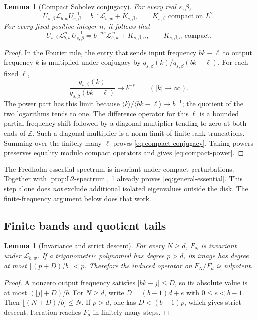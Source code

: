 \documentclass[11pt,a4paper]{article}
\newtheorem{lemma}[theorem]{Lemma}
\theoremstyle{definition}
\theoremstyle{remark}
\newcommand{\Z}{\mathbb Z}
\newcommand{\Lop}{\mathcal L}
\newcommand{\br}[1]{\langle#1\rangle}
\numberwithin{equation}{section}
\begin{document}
\begin{lemma}[Compact Sobolev conjugacy]
\label{lem:compact-conjugacy}
For every real $s,\beta$,
\begin{equation}
 U_{s,\beta}\Lop_{b,w}U_{s,\beta}^{-1}
 =b^{-s}\Lop_{b,w}+K_{s,\beta},
 \qquad K_{s,\beta}\text{ compact on }L^2.
 \label{eq:compact-conjugacy}
\end{equation}
For every fixed positive integer $n$, it follows that
\begin{equation}
 U_{s,\beta}\Lop_{b,w}^{\,n}U_{s,\beta}^{-1}
 =b^{-ns}\Lop_{b,w}^{\,n}+K_{s,\beta,n},
 \qquad K_{s,\beta,n}\text{ compact}.
 \label{eq:compact-power}
\end{equation}
\end{lemma}
\begin{proof}
In the Fourier rule, the entry that sends input frequency $bk-\ell$ to
output frequency $k$ is multiplied under conjugacy by
$q_{s,\beta}(k)/q_{s,\beta}(bk-\ell)$. For each fixed $\ell$,
\begin{equation}
 \frac{q_{s,\beta}(k)}{q_{s,\beta}(bk-\ell)}\longrightarrow b^{-s}
 \qquad (|k|\to\infty).
 \label{eq:weight-ratio}
\end{equation}
The power part has this limit because
$\br{k}/\br{bk-\ell}\to b^{-1}$; the quotient of the two logarithms tends
to one. The difference operator for this $\ell$ is a bounded partial
frequency shift followed by a diagonal multiplier tending to zero at both
ends of $\Z$. Such a diagonal multiplier is a norm limit of finite-rank
truncations. Summing over the finitely many $\ell$ proves
\eqref{eq:compact-conjugacy}. Taking powers preserves equality modulo
compact operators and gives \eqref{eq:compact-power}.
\end{proof}

The Fredholm essential spectrum is invariant under compact perturbations.
Together with \cref{prop:L2-spectrum}, \cref{lem:compact-conjugacy}
already proves \eqref{eq:general-essential}. This step alone does
\emph{not} exclude additional isolated eigenvalues outside the disk.
The finite-frequency argument below does that work.

\subsection{Finite bands and quotient tails}
\begin{lemma}[Invariance and strict descent]
\label{lem:band}
For every $N\ge d$, $F_N$ is invariant under $\Lop_{b,w}$. If a
trigonometric polynomial has degree $p>d$, its image has degree at most
$\lfloor(p+D)/b\rfloor<p$. Therefore the induced operator on $F_N/F_d$
is nilpotent.
\end{lemma}
\begin{proof}
A nonzero output frequency satisfies $|bk-j|\le D$, so its absolute value
is at most $(|j|+D)/b$. For $N\ge d$, write
$D=(b-1)d+e$ with $0\le e<b-1$. Then
$\lfloor(N+D)/b\rfloor\le N$. If $p>d$, one has $D<(b-1)p$,
which gives strict descent. Iteration reaches $F_d$ in finitely many
steps.
\end{proof}
\end{document}
